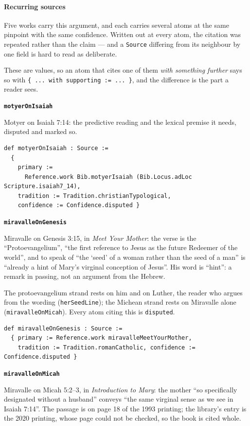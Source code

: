 \documentclass[11pt]{article}
\begin{document}
\paragraph*{Recurring sources}
\leavevmode\par\nobreak
Five works carry this argument, and each carries several atoms at the same pinpoint with the same confidence. Written out at every atom, the citation was repeated rather than the claim — and a \texttt{Source} differing from its neighbour by one field is hard to read as deliberate.

These are values, so an atom that cites one of them \emph{with something further} says so with \texttt{\{ ... with supporting := ... \}}, and the difference is the part a reader sees.

\par\medskip\noindent\textbf{\texttt{motyer\allowbreak{}On\allowbreak{}Isaiah}}\par\nobreak\noindent
Motyer on Isaiah 7:14: the predictive reading and the lexical premise it needs, disputed and marked so.

{\small\begin{verbatim}
def motyerOnIsaiah : Source :=
  {
    primary :=
      Reference.work Bib.motyerIsaiah (Bib.Locus.adLoc Scripture.isaiah7_14),
    tradition := Tradition.christianTypological,
    confidence := Confidence.disputed }
\end{verbatim}}
\par\medskip\noindent\textbf{\texttt{miravalle\allowbreak{}On\allowbreak{}Genesis}}\par\nobreak\noindent
Miravalle on Genesis 3:15, in \emph{Meet Your Mother}: the verse is the “Protoevangelium”, “the first reference to Jesus as the future Redeemer of the world”, and to speak of “the ‘seed’ of a woman rather than the seed of a man” is “already a hint of Mary’s virginal conception of Jesus”. His word is “hint”: a remark in passing, not an argument from the Hebrew.

The protoevangelium strand rests on him and on Luther, the reader who argues from the wording (\texttt{her\allowbreak{}Seed\allowbreak{}Line}); the Michean strand rests on Miravalle alone (\texttt{miravalle\allowbreak{}On\allowbreak{}Micah}). Every atom citing this is \texttt{disputed}.

{\small\begin{verbatim}
def miravalleOnGenesis : Source :=
  { primary := Reference.work miravalleMeetYourMother,
    tradition := Tradition.romanCatholic, confidence := Confidence.disputed }
\end{verbatim}}
\par\medskip\noindent\textbf{\texttt{miravalle\allowbreak{}On\allowbreak{}Micah}}\par\nobreak\noindent
Miravalle on Micah 5:2–3, in \emph{Introduction to Mary}: the mother “so specifically designated without a husband” conveys “the same virginal sense as we see in Isaiah 7:14”. The passage is on page 18 of the 1993 printing; the library’s entry is the 2020 printing, whose page could not be checked, so the book is cited whole.
\end{document}
